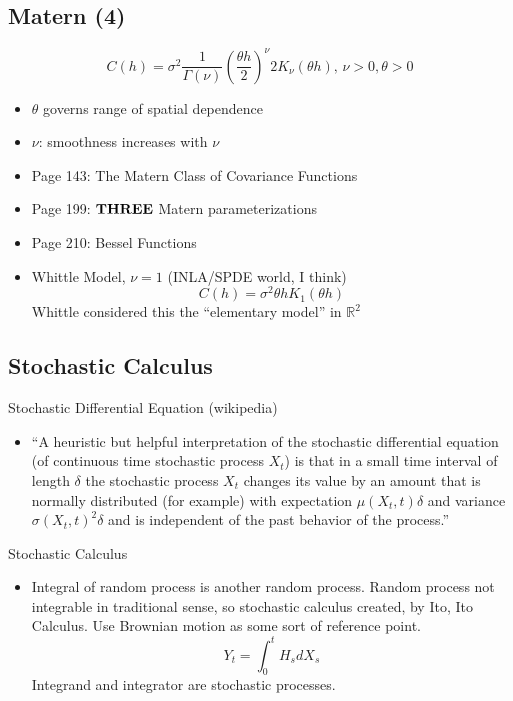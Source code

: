 \documentclass{article}
\begin{document}
\subsection*{Matern (4)}
\citep{Schabenberger2004}
$$ C(h) = \sigma^{2}\frac{1}{\Gamma(\nu)}\left(\frac{\theta h}{2}\right)^{\nu}2K_{\nu}(\theta h) \text{,   } \nu >0, \theta > 0 $$
\begin{itemize}
\item $\theta$ governs range of spatial dependence
\item $\nu$: smoothness increases with $\nu$
\item Page 143: The Matern Class of Covariance Functions
\item Page 199: ${\bf THREE}$ Matern parameterizations
\item Page 210: Bessel Functions
\item Whittle Model, $\nu = 1$ (INLA/SPDE world, I think)
$$ C(h) = \sigma^{2}\theta h K_{1}(\theta h) $$
Whittle considered this the ``elementary model'' in $\mathbb{R}^{2}$
\end{itemize}

\subsection*{Stochastic Calculus}

Stochastic Differential Equation (wikipedia)
\begin{itemize}
\item ``A heuristic but helpful interpretation of the stochastic differential equation (of continuous time stochastic process $X_{t}$) is that in a small time interval of length $\delta$ the stochastic process $X_{t}$ changes its value by an amount that is normally distributed (for example) with expectation $\mu(X_{t},t)\delta$ and variance $\sigma(X_{t}, t)^{2}\delta$ and is independent of the past behavior of the process.''
\end{itemize}
Stochastic Calculus \citep{Mao2007}
\begin{itemize}
\item Integral of random process is another random process. Random process not integrable in traditional sense, so stochastic calculus created, by Ito, Ito Calculus. Use Brownian motion as some sort of reference point.
$$ Y_{t} = \int_{0}^{t} H_{s} dX_{s} $$
Integrand and integrator are stochastic processes.
\end{itemize}
\end{document}
